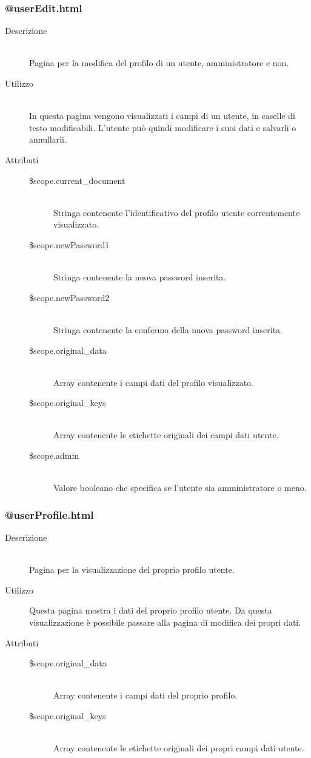 \subsubsection{@userEdit.html}
\begin{description}
	\item[Descrizione] \hfill \\
	Pagina per la modifica del profilo di un utente, amministratore e non.
	\item[Utilizzo] \hfill \\
	In questa pagina vengono visualizzati i campi di un utente, in caselle di testo modificabili. L'utente può quindi modificare i suoi dati e salvarli o annullarli.
	\item[Attributi] \hfill
 	\begin{description}
 		\item[\$scope.current\_document] \hfill \\
		Stringa contenente l'identificativo del profilo utente correntemente visualizzato.
		\item[\$scope.newPassword1] \hfill \\
		Stringa contenente la nuova password inserita.
		\item[\$scope.newPassword2] \hfill \\
		Stringa contenente la conferma della nuova password inserita.
		\item[\$scope.original\_data] \hfill \\
		Array contenente i campi dati del profilo visualizzato.
		\item[\$scope.original\_keys] \hfill \\
		Array contenente le etichette originali dei campi dati utente.
		\item[\$scope.admin] \hfill \\
		Valore booleano che specifica se l'utente sia amministratore o meno.
	\end{description}
\end{description}

\subsubsection{@userProfile.html}
\begin{description}
	\item[Descrizione] \hfill \\
	Pagina per la visualizzazione del proprio profilo utente.
	\item[Utilizzo]
	Questa pagina mostra i dati del proprio profilo utente. Da questa visualizzazione è possibile passare alla pagina di modifica dei propri dati.
	\item[Attributi] \hfill
 	\begin{description}
 		\item[\$scope.original\_data] \hfill \\
		Array contenente i campi dati del proprio profilo.
		\item[\$scope.original\_keys] \hfill \\
		Array contenente le etichette originali dei propri campi dati utente.
 	\end{description}
\end{description}


